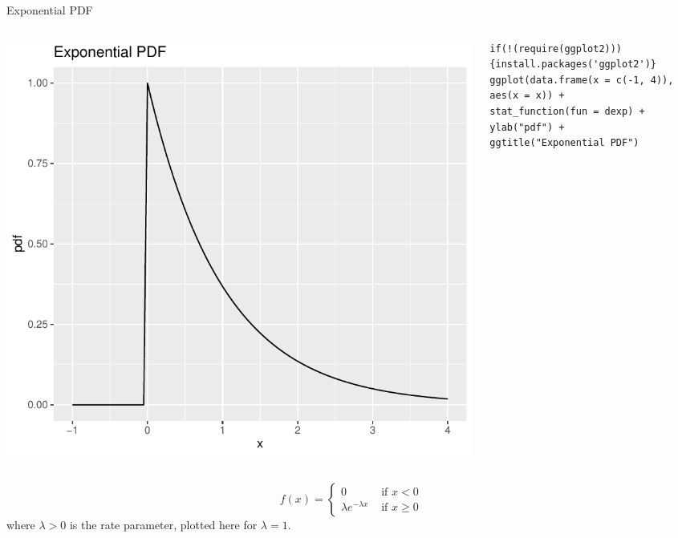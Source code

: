 \documentclass[aspectratio=169,11pt]{beamer}
\begin{document}
\begin{frame}[fragile]{Exponential PDF}
\begin{columns}
\begin{column}{0.5\textwidth}
\begin{center}
\includegraphics[height=.5\textheight]{exp-pdf} 
\end{center}
\end{column}
\begin{column}{0.5\textwidth} 
\begin{lstlisting}
if(!(require(ggplot2))){install.packages('ggplot2')}
ggplot(data.frame(x = c(-1, 4)), aes(x = x)) +
stat_function(fun = dexp) +
ylab("pdf") +
ggtitle("Exponential PDF")
\end{lstlisting}
\end{column}
\end{columns}
\[
f\left(x\right) = \begin{cases}
	0 & \text{ if }x<0\\
	\lambda e^{- \lambda x} & \text{ if }x\ge 0
\end{cases}
\]
where $\lambda > 0$ is the rate parameter, plotted here for $\lambda=1$.
\end{frame}
\end{document}
